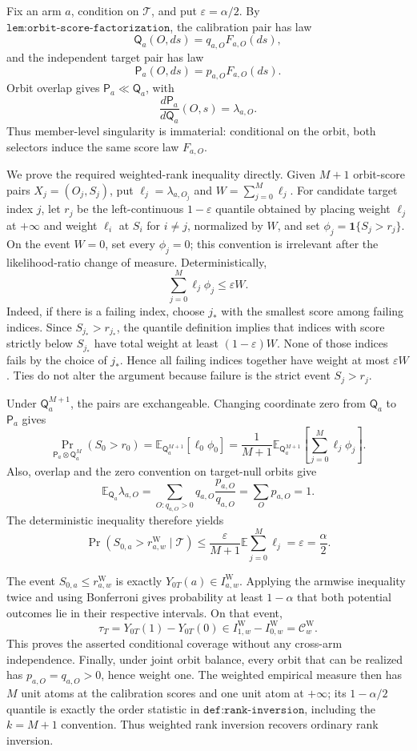 Fix an arm \(a\), condition on \(\mathcal T\), and put \(\varepsilon=\alpha/2\). By \(\texttt{lem:orbit-score-factorization}\), the calibration pair has law \[\mathsf Q_a(O,ds)=q_{a,O}F_{a,O}(ds),\] and the independent target pair has law \[\mathsf P_a(O,ds)=p_{a,O}F_{a,O}(ds).\] Orbit overlap gives \(\mathsf P_a\ll\mathsf Q_a\), with \[\frac{d\mathsf P_a}{d\mathsf Q_a}(O,s)=\lambda_{a,O}.\] Thus member-level singularity is immaterial: conditional on the orbit, both selectors induce the same score law \(F_{a,O}\).

We prove the required weighted-rank inequality directly. Given \(M+1\) orbit-score pairs \(X_j=(O_j,S_j)\), put \(\ell_j=\lambda_{a,O_j}\) and \(W=\sum_{j=0}^M\ell_j\). For candidate target index \(j\), let \(r_j\) be the left-continuous \(1-\varepsilon\) quantile obtained by placing weight \(\ell_j\) at \(+\infty\) and weight \(\ell_i\) at \(S_i\) for \(i\ne j\), normalized by \(W\), and set \(\phi_j=\mathbf 1\{S_j>r_j\}\). On the event \(W=0\), set every \(\phi_j=0\); this convention is irrelevant after the likelihood-ratio change of measure. Deterministically, \[\sum_{j=0}^M\ell_j\phi_j\le\varepsilon W.\] Indeed, if there is a failing index, choose \(j_*\) with the smallest score among failing indices. Since \(S_{j_*}>r_{j_*}\), the quantile definition implies that indices with score strictly below \(S_{j_*}\) have total weight at least \((1-\varepsilon)W\). None of those indices fails by the choice of \(j_*\). Hence all failing indices together have weight at most \(\varepsilon W\). Ties do not alter the argument because failure is the strict event \(S_j>r_j\).

Under \(\mathsf Q_a^{M+1}\), the pairs are exchangeable. Changing coordinate zero from \(\mathsf Q_a\) to \(\mathsf P_a\) gives \[\Pr_{\mathsf P_a\otimes\mathsf Q_a^M}(S_0>r_0)=\mathbb E_{\mathsf Q_a^{M+1}}[\ell_0\phi_0]=\frac1{M+1}\mathbb E_{\mathsf Q_a^{M+1}}\!\left[\sum_{j=0}^M\ell_j\phi_j\right].\] Also, overlap and the zero convention on target-null orbits give \[\mathbb E_{\mathsf Q_a}\lambda_{a,O}=\sum_{O:q_{a,O}>0}q_{a,O}\frac{p_{a,O}}{q_{a,O}}=\sum_Op_{a,O}=1.\] The deterministic inequality therefore yields \[\Pr(S_{0,a}>r^{\mathrm W}_{a,w}\mid\mathcal T)\le\frac{\varepsilon}{M+1}\mathbb E\sum_{j=0}^M\ell_j=\varepsilon=\frac\alpha2.\]

The event \(S_{0,a}\le r^{\mathrm W}_{a,w}\) is exactly \(Y_{0T}(a)\in I^{\mathrm W}_{a,w}\). Applying the armwise inequality twice and using Bonferroni gives probability at least \(1-\alpha\) that both potential outcomes lie in their respective intervals. On that event, \[\tau_T=Y_{0T}(1)-Y_{0T}(0)\in I^{\mathrm W}_{1,w}-I^{\mathrm W}_{0,w}=\mathcal C^{\mathrm W}_w.\] This proves the asserted conditional coverage without any cross-arm independence. Finally, under joint orbit balance, every orbit that can be realized has \(p_{a,O}=q_{a,O}>0\), hence weight one. The weighted empirical measure then has \(M\) unit atoms at the calibration scores and one unit atom at \(+\infty\); its \(1-\alpha/2\) quantile is exactly the order statistic in \(\texttt{def:rank-inversion}\), including the \(k=M+1\) convention. Thus weighted rank inversion recovers ordinary rank inversion.